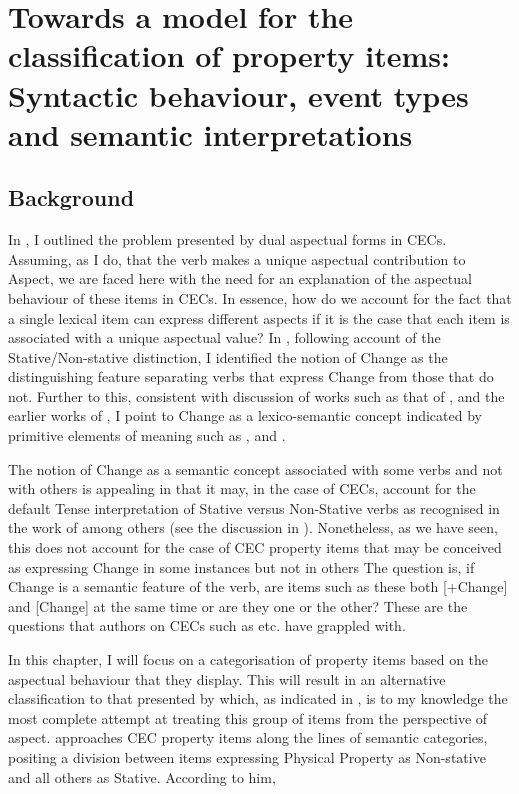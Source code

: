 \chapter[Syntactic behaviour, event types and semantic interpretations]{Towards a model for the classification of property items:
Syntactic behaviour, event types and semantic interpretations}
 \label{sec:5}\label{ch:5}

\section{Background}\label{sec:5.0}

In , I outlined the problem presented by dual aspectual forms in CECs. Assuming, as I do, that the verb makes a unique aspectual contribution to Aspect, we are faced here with the need for an explanation of the aspectual behaviour of these items in CECs. In essence, how do we account for the fact that a single lexical item can express different aspects if it is the case that each item is associated with a unique aspectual value? In , following  account of the Stative\slash Non-stative distinction, I identified the notion of Change as the distinguishing feature separating verbs that express Change from those that do not. Further to this, consistent with discussion of works such as that of \citet{Levin1993}, and the earlier works of \citet{McCawley1968,Carter1976,Dowty1979,Pustejovsky1988,Grimshaw1990}, I point to Change as a lexico-semantic concept indicated by primitive elements of meaning such as \BECOME, \CAUSE and \DO. 

The notion of Change as a semantic concept associated with some verbs and not with others is appealing in that it may, in the case of CECs, account for the default Tense interpretation of Stative versus Non-Stative verbs as recognised in the work of \citet{Bickerton1975,Winford1993,Gooden2008} among others (see the discussion in ). Nonetheless, as we have seen, this does not account for the case of CEC property items that may be conceived as expressing Change in some instances but not in others The question is, if Change is a semantic feature of the verb, are items such as these both [+Change] and [\textminus Change] at the same time or are they one or the other? These are the questions that authors on CECs such as \citet{Bickerton1975,Jaganauth1987,Winford1993,Sidnell2002,} etc. have grappled with. 

In this chapter, I will focus on a categorisation of property items based on the aspectual behaviour that they display. This will result in an alternative classification to that presented by \citet{Winford1993} which, as indicated in , is to my knowledge the most complete attempt at treating this group of items from the perspective of aspect. \citet{Winford1993} approaches CEC property items along the lines of  semantic categories, positing a division between items expressing Physical Property as Non-stative and all others as Stative. According to him, 


